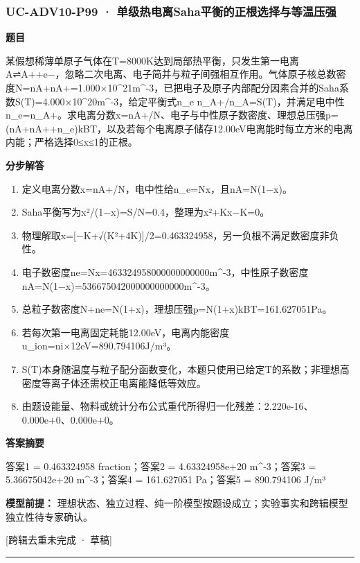 \documentclass[UTF8,11pt,a4paper]{ctexart}
\begin{document}
\subsubsection*{UC-ADV10-P99 · 单级热电离Saha平衡的正根选择与等温压强}
\noindent\textbf{题目}\par
某假想稀薄单原子气体在T=8000K达到局部热平衡，只发生第一电离A⇌A++e−，忽略二次电离、电子简并与粒子间强相互作用。气体原子核总数密度N=nA+nA+=1.000×10\textasciicircum{}21m\textasciicircum{}-3，已把电子及原子内部配分因素合并的Saha系数S(T)=4.000×10\textasciicircum{}20m\textasciicircum{}-3，给定平衡式n\_e n\_A+/n\_A=S(T)，并满足电中性n\_e=n\_A+。求电离分数x=nA+/N、电子与中性原子数密度、理想总压强p=(nA+nA++n\_e)kBT，以及若每个电离原子储存12.00eV电离能时每立方米的电离内能；严格选择0≤x≤1的正根。\par
\medskip\noindent\textbf{分步解答}
\begin{enumerate}
\item 定义电离分数x=nA+/N，电中性给n\_e=Nx，且nA=N(1−x)。
\item Saha平衡写为x²/(1−x)=S/N=0.4，整理为x²+Kx−K=0。
\item 物理解取x=[−K+√(K²+4K)]/2=0.463324958，另一负根不满足数密度非负性。
\item 电子数密度ne=Nx=463324958000000000000m\textasciicircum{}-3，中性原子数密度nA=N(1−x)=536675042000000000000m\textasciicircum{}-3。
\item 总粒子数密度N+ne=N(1+x)，理想压强p=N(1+x)kBT=161.627051Pa。
\item 若每次第一电离固定耗能12.00eV，电离内能密度u\_ion=ni×12eV=890.794106J/m³。
\item S(T)本身随温度与粒子配分函数变化，本题只使用已给定T的系数；非理想高密度等离子体还需校正电离能降低等效应。
\item 由题设能量、物料或统计分布公式重代所得归一化残差：2.220e-16、0.000e+0、0.000e+0。
\end{enumerate}
\noindent\textbf{答案摘要}\par
答案1 = 0.463324958 fraction；答案2 = 4.63324958e+20 m\textasciicircum{}-3；答案3 = 5.36675042e+20 m\textasciicircum{}-3；答案4 = 161.627051 Pa；答案5 = 890.794106 J/m³\par
\noindent\textbf{模型前提：}
理想状态、独立过程、纯一阶模型按题设成立；实验事实和跨辑模型独立性待专家确认。\par
\noindent\textcolor{red!65!black}{[跨辑去重未完成 · 草稿]} \par
\medskip\hrule\medskip
{}
\end{document}
